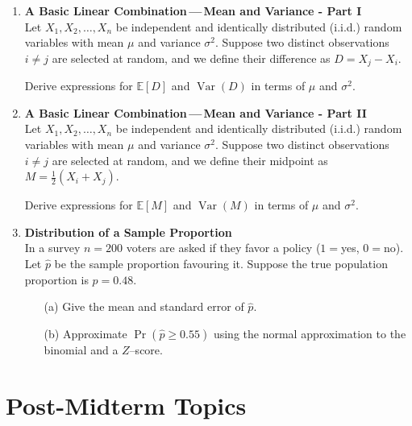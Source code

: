 \documentclass{article}
\begin{document}
\begin{enumerate}
    \item \textbf{A Basic Linear Combination\,—\,Mean and Variance - Part I}  \\
        Let \( X_1, X_2, \dots, X_n \) be independent and identically distributed (i.i.d.) random variables with mean \( \mu \) and variance \( \sigma^2 \). Suppose two distinct observations \( i \ne j \) are selected at random, and we define their difference as \( D = X_j - X_i \).  
        
        Derive expressions for \( \mathbb{E}[D] \) and \( \operatorname{Var}(D) \) in terms of \( \mu \) and \( \sigma^2 \).

\item \textbf{A Basic Linear Combination\,—\,Mean and Variance - Part II}  \\
    Let \( X_1, X_2, \dots, X_n \) be independent and identically distributed (i.i.d.) random variables with mean \( \mu \) and variance \( \sigma^2 \). Suppose two distinct observations \( i \ne j \) are selected at random, and we define their midpoint as \( M = \frac{1}{2}(X_i + X_j) \).  
    
    Derive expressions for \( \mathbb{E}[M] \) and \( \operatorname{Var}(M) \) in terms of \( \mu \) and \( \sigma^2 \).


    \item \textbf{Distribution of a Sample Proportion}  \\
          In a survey $n=200$ voters are asked if they favor a policy ($1=$yes, $0=$no).  Let $\hat{p}$ be the sample proportion favouring it.  
          Suppose the true population proportion is $p=0.48$.  
          \begin{enumerate}
              \item[(a)] Give the mean and standard error of $\hat{p}$.  
              \item[(b)] Approximate $\Pr(\hat{p}\ge 0.55)$ using the normal approximation to the binomial and a $Z$–score.  
          \end{enumerate}

\end{enumerate}


\section{Post-Midterm Topics}
\end{document}
